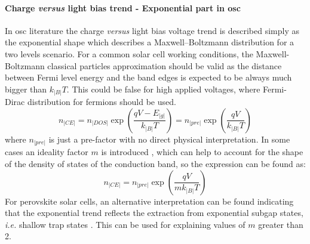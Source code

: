 		\paragraph{Charge \textit{versus} light bias trend - Exponential part in \gls{osc}}
		In \gls{osc} literature the charge \textit{versus} light bias voltage trend is described simply as the exponential shape which describes a Maxwell--Boltzmann distribution for a two levels scenario.
		For a common solar cell working conditions, the Maxwell-Boltzmann classical particles approximation should be valid as the distance between Fermi level energy and the band edges is expected to be always much bigger than $k_|B|T$.
		This could be false for high applied voltages, where Fermi-Dirac distribution for fermions should be used.
		$$n_|CE| = n_|DOS| \exp(\frac{qV - E_|g|}{k_|B|T}) = n_|pre| \exp(\frac{qV}{k_|B|T})$$
		where $n_|pre|$ is just a pre-factor with no direct physical interpretation.
		In some cases an ideality factor $m$ is introduced \cite{Kirchartz2012}, which can help to account for the shape of the density of states of the conduction band, so the expression can be found as:
		\begin{equation}\label{eq:ce_osc}
			n_|CE| = n_|pre| \exp(\frac{qV}{mk_|B|T})
		\end{equation}
		For perovskite solar cells, an alternative interpretation can be found indicating that the exponential trend reflects the extraction from exponential subgap states, \textit{i.e.} shallow trap states \cite{Du2018}.
		This can be used for explaining values of $m$ greater than 2.
		
